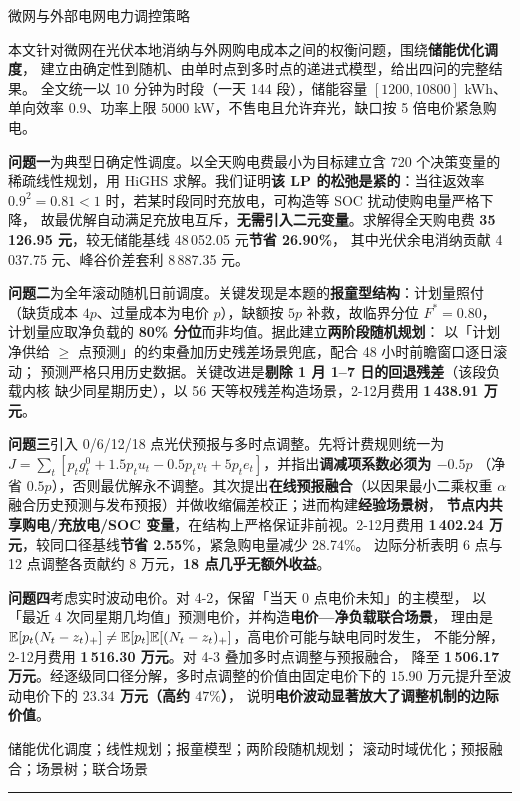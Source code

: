 \begin{center}
  {\heiti{} 微网与外部电网电力调控策略}
\end{center}

\vspace{0.4em}


\vspace{0.2em}

本文针对微网在光伏本地消纳与外网购电成本之间的权衡问题，围绕\textbf{储能优化调度}，
建立由确定性到随机、由单时点到多时点的递进式模型，给出四问的完整结果。
全文统一以 10 分钟为时段（一天 144 段），储能容量 $[1200,10800]$ kWh、
单向效率 $0.9$、功率上限 $5000$ kW，不售电且允许弃光，缺口按 5 倍电价紧急购电。

\textbf{问题一}为典型日确定性调度。以全天购电费最小为目标建立含 720 个决策变量的
稀疏线性规划，用 HiGHS 求解。我们证明\textbf{该 LP 的松弛是紧的}：当往返效率
$0.9^2=0.81<1$ 时，若某时段同时充放电，可构造等 SOC 扰动使购电量严格下降，
故最优解自动满足充放电互斥，\textbf{无需引入二元变量}。求解得全天购电费
\textbf{35\,126.95 元}，较无储能基线 48\,052.05 元\textbf{节省 26.90\%}，
其中光伏余电消纳贡献 4\,037.75 元、峰谷价差套利 8\,887.35 元。

\textbf{问题二}为全年滚动随机日前调度。关键发现是本题的\textbf{报童型结构}：计划量照付
（缺货成本 $4p$、过量成本为电价 $p$），缺额按 $5p$ 补救，故临界分位 $F^*=0.80$，
计划量应取净负载的 \textbf{80\% 分位}而非均值。据此建立\textbf{两阶段随机规划}：
以「计划净供给 $\ge$ 点预测」的约束叠加历史残差场景兜底，配合 48 小时前瞻窗口逐日滚动；
预测严格只用历史数据。关键改进是\textbf{剔除 1 月 1--7 日的回退残差}（该段负载内核
缺少同星期历史），以 56 天等权残差构造场景，2-12月费用 \textbf{1\,438.91 万元}。

\textbf{问题三}引入 0/6/12/18 点光伏预报与多时点调整。先将计费规则统一为
$J=\sum_t[p_tg_t^0+1.5p_tu_t-0.5p_tv_t+5p_te_t]$，并指出\textbf{调减项系数必须为 $-0.5p$}
（净省 $0.5p$），否则最优解永不调整。其次提出\textbf{在线预报融合}（以因果最小二乘权重
$\alpha$ 融合历史预测与发布预报）并做收缩偏差校正；进而构建\textbf{经验场景树}，
\textbf{节点内共享购电/充放电/SOC 变量}，在结构上严格保证非前视。2-12月费用
\textbf{1\,402.24 万元}，较同口径基线\textbf{节省 2.55\%}，紧急购电量减少 28.74\%。
边际分析表明 6 点与 12 点调整各贡献约 8 万元，\textbf{18 点几乎无额外收益}。

\textbf{问题四}考虑实时波动电价。对 4-2，保留「当天 0 点电价未知」的主模型，
以「最近 4 次同星期几均值」预测电价，并构造\textbf{电价—净负载联合场景}，
理由是 $\mathbb{E}[p_t(N_t-z_t)_+]\neq\mathbb{E}[p_t]\mathbb{E}[(N_t-z_t)_+]$，高电价可能与缺电同时发生，
不能分解，2-12月费用 \textbf{1\,516.30 万元}。对 4-3 叠加多时点调整与预报融合，
降至 \textbf{1\,506.17 万元}。经逐级同口径分解，多时点调整的价值由固定电价下的
$15.90$ 万元提升至波动电价下的 \textbf{$23.34$ 万元（高约 $47\%$）}，
说明\textbf{电价波动显著放大了调整机制的边际价值}。

\vspace{0.3em}
\quad 储能优化调度；线性规划；报童模型；两阶段随机规划；
滚动时域优化；预报融合；场景树；联合场景

\vspace{0.6em}
\noindent\rule{\textwidth}{0.4pt}

